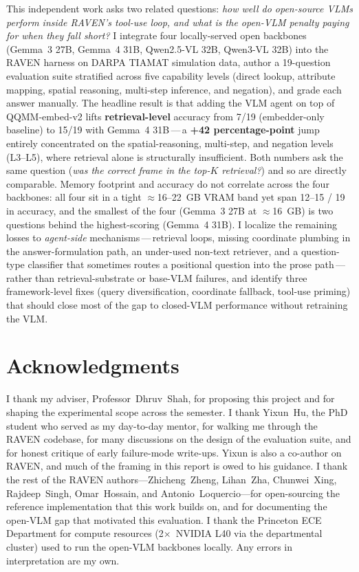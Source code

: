 \documentclass[12pt,letterpaper,oneside]{article}
\begin{document}
This independent work asks two related questions: \emph{how well do
open-source VLMs perform inside RAVEN's tool-use loop, and what is the
open-VLM penalty paying for when they fall short?}  I integrate four
locally-served open backbones (Gemma~3 27B, Gemma~4 31B, Qwen2.5-VL
32B, Qwen3-VL 32B) into the RAVEN harness on DARPA TIAMAT simulation
data, author a 19-question
evaluation suite stratified across five capability levels (direct
lookup, attribute mapping, spatial reasoning, multi-step inference,
and negation), and grade each answer manually. The headline result is
that adding the VLM agent on top of QQMM-embed-v2 lifts
\textbf{retrieval-level} accuracy from 7/19 (embedder-only baseline)
to 15/19 with Gemma~4 31B\,---\,a \textbf{+42 percentage-point} jump
entirely concentrated on the spatial-reasoning, multi-step, and
negation levels (L3--L5), where retrieval alone is structurally
insufficient.  Both numbers ask the same question (\emph{was the
correct frame in the top-$K$ retrieval?}) and so are directly
comparable.
Memory footprint and accuracy do not correlate across the four
backbones: all four sit in a tight $\approx$16--22~GB VRAM band yet
span 12--15 / 19 in accuracy, and the smallest of the four
(Gemma~3 27B at $\approx$16~GB) is two questions behind the
highest-scoring (Gemma~4 31B). I localize the remaining losses to \emph{agent-side}
mechanisms\,---\,retrieval loops, missing coordinate plumbing in the
answer-formulation path, an under-used non-text retriever, and a
question-type classifier that sometimes routes a positional question
into the prose path\,---\,rather than retrieval-substrate or base-VLM
failures, and identify three framework-level fixes (query
diversification, coordinate fallback, tool-use priming) that should
close most of the gap to closed-VLM performance without retraining
the VLM.
\newpage

\thispagestyle{empty}
\section*{Acknowledgments}
I thank my adviser, Professor~Dhruv~Shah, for proposing this project
and for shaping the experimental scope across the semester.  I thank
Yixun~Hu, the PhD student who served as my day-to-day mentor, for
walking me through the RAVEN codebase, for many discussions on the
design of the evaluation suite, and for honest critique of early
failure-mode write-ups.  Yixun is also a co-author on RAVEN, and
much of the framing in this report is owed to his guidance.  I thank
the rest of the RAVEN authors---Zhicheng~Zheng, Lihan~Zha, Chunwei~Xing,
Rajdeep~Singh, Omar~Hossain, and Antonio~Loquercio---for open-sourcing
the reference implementation that this work builds on, and for
documenting the open-VLM gap that motivated this evaluation.  I thank
the Princeton ECE Department for compute resources
(2$\times$~NVIDIA L40 via the departmental cluster) used to run the
open-VLM backbones locally.  Any errors in interpretation are my own.
\newpage
\end{document}
